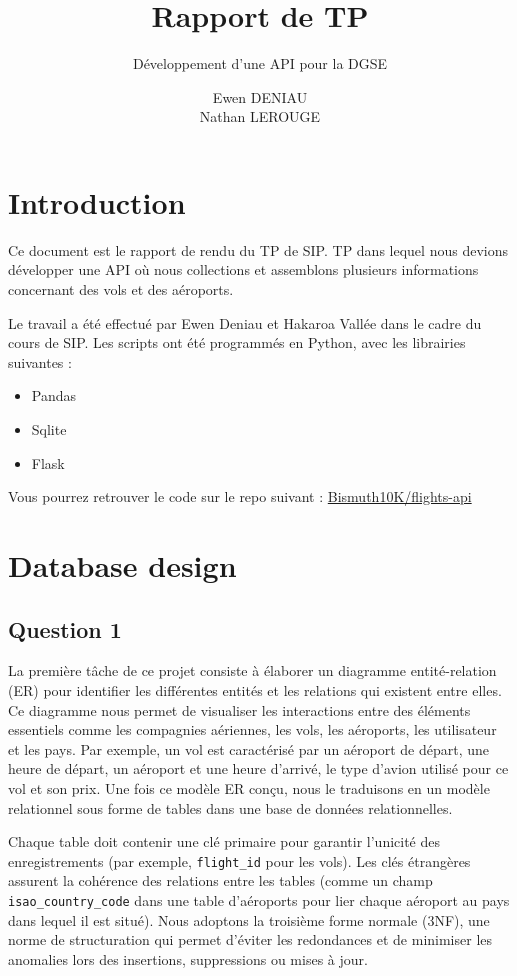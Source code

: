 \documentclass[light]{ceri/sty/rapport}
\title{Rapport de TP}
\subtitle{Développement d'une API pour la DGSE} %
\author{
Ewen DENIAU\\
Nathan LEROUGE
}
\begin{document}
 

\maketitle

\sloppy      

\section{Introduction}
Ce document est le rapport de rendu du TP de SIP.
TP dans lequel nous devions développer une API où nous collections et assemblons plusieurs informations concernant des vols et des aéroports.

Le travail a été effectué par Ewen Deniau et Hakaroa Vallée dans le cadre du cours de SIP.
Les scripts ont été programmés en Python, avec les librairies suivantes :
\begin{itemize}
    \item Pandas
    \item Sqlite
    \item Flask
\end{itemize}

Vous pourrez retrouver le code sur le repo suivant : \href{https://github.com/Bismuth10K/flights-api}{Bismuth10K/flights-api}

\section{Database design}
\subsection{Question 1}
La première tâche de ce projet consiste à élaborer un diagramme entité-relation (ER) pour identifier les différentes entités et les relations qui existent entre elles. Ce diagramme nous permet de visualiser les interactions entre des éléments essentiels comme les compagnies aériennes, les vols, les aéroports, les utilisateur et les pays. Par exemple, un vol est caractérisé par un aéroport de départ, une heure de départ, un aéroport et une heure d'arrivé, le type d'avion utilisé pour ce vol et son prix. Une fois ce modèle ER conçu, nous le traduisons en un modèle relationnel sous forme de tables dans une base de données relationnelles.

Chaque table doit contenir une clé primaire pour garantir l’unicité des enregistrements (par exemple, \texttt{flight_id} pour les vols). Les clés étrangères assurent la cohérence des relations entre les tables (comme un champ \texttt{isao_country_code} dans une table d'aéroports pour lier chaque aéroport au pays dans lequel il est situé). Nous adoptons la troisième forme normale (3NF), une norme de structuration qui permet d’éviter les redondances et de minimiser les anomalies lors des insertions, suppressions ou mises à jour.
\end{document}
